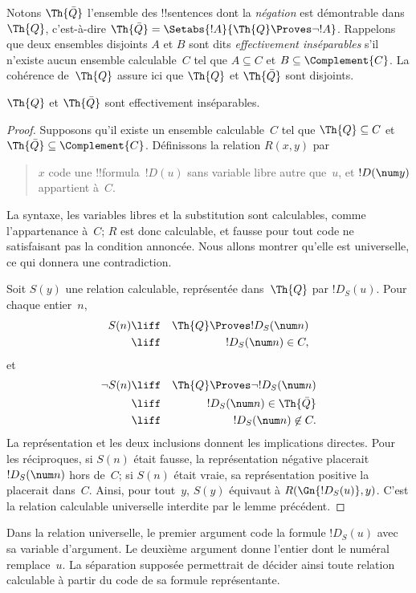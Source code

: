 \documentclass[../../../include/open-logic-section]{subfiles}
\begin{document}


Notons $\Th{\bar Q}$ l'ensemble des !!{sentence}s
dont la \emph{négation} est démontrable dans
$\Th{Q}$, c'est-à-dire
$\Th{\bar Q}=\Setabs{!A}{\Th{Q}\Proves\lnot !A}$.
Rappelons que deux ensembles disjoints $A$ et $B$
sont dits \emph{effectivement inséparables} s'il
n'existe aucun ensemble calculable~$C$ tel que
$A\subseteq C$ et $B\subseteq\Complement{C}$.
La cohérence de~$\Th{Q}$ assure ici que
$\Th{Q}$ et $\Th{\bar Q}$ sont disjoints.

\begin{lem}
$\Th{Q}$ et $\Th{\bar Q}$ sont effectivement
inséparables.
\end{lem}

\begin{proof}
Supposons qu'il existe un ensemble calculable~$C$
tel que $\Th{Q}\subseteq C$ et
$\Th{\bar Q}\subseteq\Complement{C}$.
Définissons la relation $R(x,y)$ par
\begin{quote}
$x$ code une !!{formula}~$!D(u)$ sans variable libre autre que~$u$,
et $!D(\num y)$ appartient à~$C$.
\end{quote}
La syntaxe, les variables libres et la substitution sont calculables,
comme l'appartenance à~$C$; $R$ est donc calculable, et fausse pour tout code ne satisfaisant pas la condition annoncée.
Nous allons montrer qu'elle est universelle,
ce qui donnera une contradiction.

Soit $S(y)$ une relation calculable, représentée
dans~$\Th{Q}$ par $!D_S(u)$. Pour chaque entier~$n$,
\begin{eqnarray*}
S(n) & \liff & \Th{Q}\Proves !D_S(\num n) \\
& \liff & !D_S(\num n)\in C,
\end{eqnarray*}
et
\begin{eqnarray*}
\lnot S(n) & \liff & \Th{Q}\Proves\lnot !D_S(\num n) \\
& \liff & !D_S(\num n)\in\Th{\bar Q} \\
& \liff & !D_S(\num n)\not\in C.
\end{eqnarray*}
La représentation et les deux inclusions donnent les
implications directes. Pour les réciproques,
si $S(n)$ était fausse, la représentation négative
placerait $!D_S(\num n)$ hors de~$C$; si $S(n)$
était vraie, sa représentation positive la
placerait dans~$C$. Ainsi, pour tout~$y$,
$S(y)$ équivaut à $R(\Gn{!D_S(u)},y)$.
C'est la relation calculable universelle interdite
par le lemme précédent.
\end{proof}

\begin{explain}
Dans la relation universelle, le premier argument code la
formule $!D_S(u)$ avec sa variable d'argument. Le deuxième
argument donne l'entier dont le numéral remplace~$u$.
La séparation supposée permettrait de décider ainsi toute
relation calculable à partir du code de sa formule représentante.
\end{explain}
\end{document}
